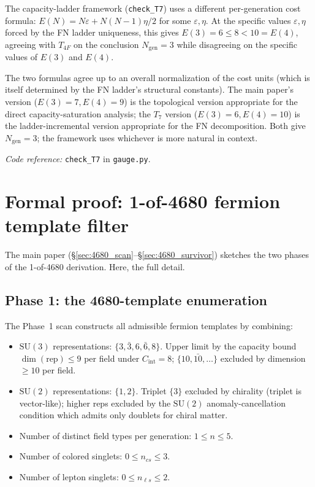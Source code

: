 \documentclass[11pt]{article}
\newcommand{\coderef}[2]{\smallskip\noindent\textit{Code reference:} \texttt{#1} in \texttt{#2}.}
\newcommand{\SU}{\mathrm{SU}}
\theoremstyle{definition}
\begin{document}
The capacity-ladder framework (\texttt{check\_T7}) uses a different per-generation cost formula: $E(N) = N\varepsilon + N(N-1)\eta/2$ for some $\varepsilon, \eta$. At the specific values $\varepsilon, \eta$ forced by the FN ladder uniqueness, this gives $E(3) = 6 \leq 8 < 10 = E(4)$, agreeing with $T_{4F}$ on the conclusion $N_{\mathrm{gen}} = 3$ while disagreeing on the specific values of $E(3)$ and $E(4)$.

The two formulas agree up to an overall normalization of the cost units (which is itself determined by the FN ladder's structural constants). The main paper's version ($E(3) = 7, E(4) = 9$) is the topological version appropriate for the direct capacity-saturation analysis; the $T_7$ version ($E(3) = 6, E(4) = 10$) is the ladder-incremental version appropriate for the FN decomposition. Both give $N_{\mathrm{gen}} = 3$; the framework uses whichever is more natural in context.

\coderef{check\_T7}{gauge.py}

\clearpage

\section{Formal proof: 1-of-4680 fermion template filter}\label{sec:4680_full}

The main paper (\S\ref{sec:4680_scan}--\S\ref{sec:4680_survivor}) sketches the two phases of the 1-of-4680 derivation. Here, the full detail.

\subsection{Phase 1: the 4680-template enumeration}\label{sec:4680_phase1}

The Phase~1 scan constructs all admissible fermion templates by combining:

\begin{itemize}
    \item $\SU(3)$ representations: $\{3, \bar 3, 6, \bar 6, 8\}$. Upper limit by the capacity bound $\dim(\mathrm{rep}) \leq 9$ per field under $C_{\mathrm{int}} = 8$; $\{10, \bar{10}, \ldots\}$ excluded by dimension $\geq 10$ per field.
    \item $\SU(2)$ representations: $\{1, 2\}$. Triplet $\{3\}$ excluded by chirality (triplet is vector-like); higher reps excluded by the $\SU(2)$ anomaly-cancellation condition which admits only doublets for chiral matter.
    \item Number of distinct field types per generation: $1 \leq n \leq 5$.
    \item Number of colored singlets: $0 \leq n_{cs} \leq 3$.
    \item Number of lepton singlets: $0 \leq n_{\ell s} \leq 2$.
\end{itemize}
\end{document}
